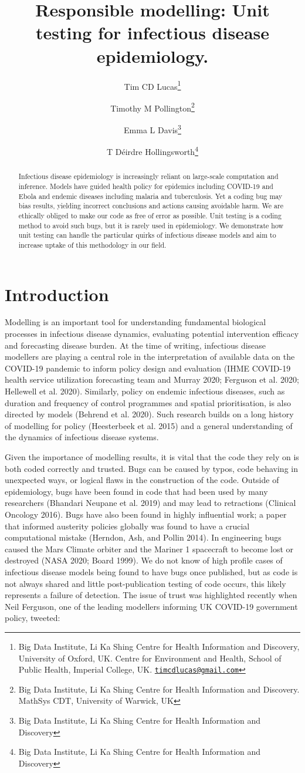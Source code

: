 \documentclass[
]{article}
\title{Responsible modelling: Unit testing for infectious disease epidemiology.}
\author{Tim CD Lucas\footnote{Big Data Institute, Li Ka Shing Centre for Health Information and Discovery, University of Oxford, UK. Centre for Environment and Health, School of Public Health, Imperial College, UK. \href{mailto:timcdlucas@gmail.com}{\nolinkurl{timcdlucas@gmail.com}}} \and Timothy M Pollington\footnote{Big Data Institute, Li Ka Shing Centre for Health Information and Discovery. MathSys CDT, University of Warwick, UK} \and Emma L Davis\footnote{Big Data Institute, Li Ka Shing Centre for Health Information and Discovery} \and T Déirdre Hollingsworth\footnote{Big Data Institute, Li Ka Shing Centre for Health Information and Discovery}}
\date{}
\begin{document}
\maketitle
\begin{abstract}
Infectious disease epidemiology is increasingly reliant on large-scale computation and inference.
Models have guided health policy for epidemics including COVID-19 and Ebola and endemic diseases including malaria and tuberculosis.
Yet a coding bug may bias results, yielding incorrect conclusions and actions causing avoidable harm.
We are ethically obliged to make our code as free of error as possible.
Unit testing is a coding method to avoid such bugs, but it is rarely used in epidemiology.
We demonstrate how unit testing can handle the particular quirks of infectious disease models and aim to increase uptake of this methodology in our field.
\end{abstract}

\newpage

\hypertarget{introduction}{%
\section{Introduction}\label{introduction}}

\linenumbers

Modelling is an important tool for understanding fundamental biological processes in infectious disease dynamics, evaluating potential intervention efficacy and forecasting disease burden.
At the time of writing, infectious disease modellers are playing a central role in the interpretation of available data on the COVID-19 pandemic to inform policy design and evaluation (IHME COVID-19 health service utilization forecasting team and Murray 2020; Ferguson et al. 2020; Hellewell et al. 2020).
Similarly, policy on endemic infectious diseases, such as duration and frequency of control programmes and spatial prioritisation, is also directed by models (Behrend et al. 2020).
Such research builds on a long history of modelling for policy (Heesterbeek et al. 2015) and a general understanding of the dynamics of infectious disease systems.

Given the importance of modelling results, it is vital that the code they rely on is both coded correctly and trusted.
Bugs can be caused by typos, code behaving in unexpected ways, or logical flaws in the construction of the code.
Outside of epidemiology, bugs have been found in code that had been used by many researchers (Bhandari Neupane et al. 2019) and may lead to retractions (Clinical Oncology 2016).
Bugs have also been found in highly influential work; a paper that informed austerity policies globally was found to have a crucial computational mistake (Herndon, Ash, and Pollin 2014).
In engineering bugs caused the Mars Climate orbiter and the Mariner 1 spacecraft to become lost or destroyed (NASA 2020; Board 1999).
We do not know of high profile cases of infectious disease models being found to have bugs once published, but as code is not always shared and little post-publication testing of code occurs, this likely represents a failure of detection.
The issue of trust was highlighted recently when Neil Ferguson, one of the leading modellers informing UK COVID-19 government policy, tweeted:
\end{document}
